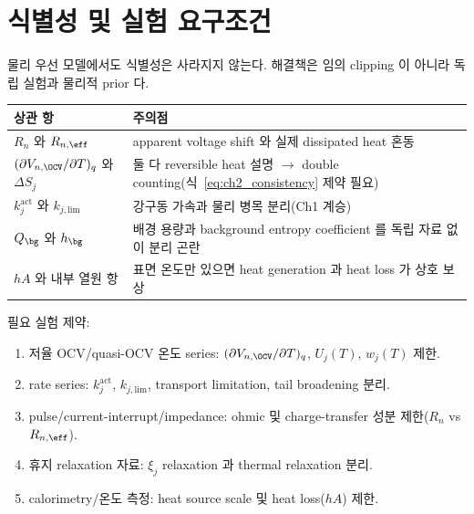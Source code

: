 \section{식별성 및 실험 요구조건}\label{sec:ch2_ident}
물리 우선 모델에서도 식별성은 사라지지 않는다. 해결책은 임의 clipping 이 아니라 독립 실험과 물리적 prior 다.
\begin{longtable}{p{} p{}}
\toprule 상관 항 & 주의점 \\ \midrule \endhead
$R_n$ 와 $R_{n,\eff}$ & apparent voltage shift 와 실제 dissipated heat 혼동 \\
$(\partial V_{n,\OCV}/\partial T)_q$ 와 $\Delta S_j$ & 둘 다 reversible heat 설명 $\to$ double counting(식~\eqref{eq:ch2_consistency} 제약 필요) \\
$k_j^{\mathrm{act}}$ 와 $k_{j,\mathrm{lim}}$ & 강구동 가속과 물리 병목 분리(Ch1 계승) \\
$Q_\bg$ 와 $h_\bg$ & 배경 용량과 background entropy coefficient 를 독립 자료 없이 분리 곤란 \\
$hA$ 와 내부 열원 항 & 표면 온도만 있으면 heat generation 과 heat loss 가 상호 보상 \\
\bottomrule
\end{longtable}
필요 실험 제약:
\begin{enumerate}[label=\arabic*),leftmargin=2.0em]
\item 저율 OCV/quasi-OCV 온도 series: $(\partial V_{n,\OCV}/\partial T)_q$, $U_j(T)$, $w_j(T)$ 제한.
\item rate series: $k_j^{\mathrm{act}}$, $k_{j,\mathrm{lim}}$, transport limitation, tail broadening 분리.
\item pulse/current-interrupt/impedance: ohmic 및 charge-transfer 성분 제한($R_n$ vs $R_{n,\eff}$).
\item 휴지 relaxation 자료: $\xi_j$ relaxation 과 thermal relaxation 분리.
\item calorimetry/온도 측정: heat source scale 및 heat loss($hA$) 제한.
\end{enumerate}


